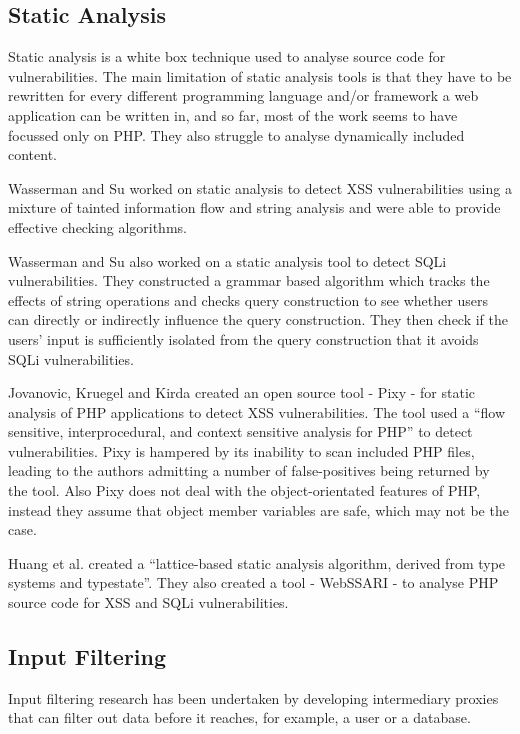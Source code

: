 \documentclass[12pt,a4paper]{article}
\begin{document}
\subsection{Static Analysis}
Static analysis is a white box technique used to analyse source code for vulnerabilities.  The main limitation of static analysis tools is that they have to be rewritten for every different programming language and/or framework a web application can be written in, and so far, most of the work seems to have focussed only on PHP.  They also struggle to analyse dynamically included content.

Wasserman and Su worked on static analysis to detect XSS vulnerabilities using a mixture of tainted information flow and  string analysis and were able to provide effective checking algorithms. \cite{Wassermann2008}

Wasserman and Su also worked on a static analysis tool to detect SQLi vulnerabilities.  They constructed a grammar based algorithm which tracks the effects of string operations and checks query construction to see whether users can directly or indirectly influence the query construction.   They then check if the users’ input is sufficiently  isolated from the query construction that it avoids SQLi vulnerabilities. \cite{Wassermann2007}

Jovanovic, Kruegel and  Kirda created an open source tool - Pixy - for static analysis of PHP applications to detect XSS vulnerabilities.  The tool used a “flow sensitive, interprocedural, and context sensitive analysis for PHP” to detect vulnerabilities. \cite{Jovanovic2006}  Pixy is hampered by its inability to scan included PHP files, leading to the authors admitting a number of false-positives being returned by the tool.  Also Pixy does not deal with the object-orientated features of PHP, instead they assume that object member variables are safe, which may not be the case.

Huang et al. created a “lattice-based static analysis algorithm, derived from type systems and typestate”.  They also created a tool - WebSSARI - to analyse PHP source code for XSS and SQLi vulnerabilities. \cite{Huang2004}

\subsection{Input Filtering}
Input filtering research has been undertaken by developing intermediary proxies that can filter out data before it reaches, for example, a user or a database.
\end{document}
